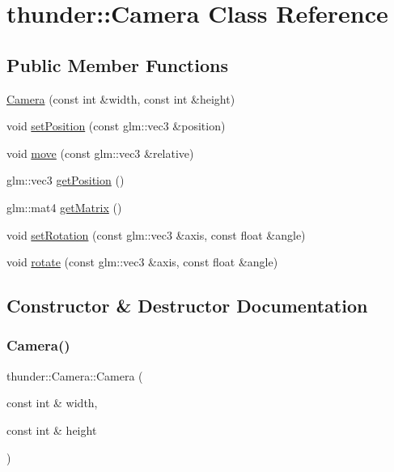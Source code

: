 \hypertarget{classthunder_1_1_camera}{}\section{thunder\+:\+:Camera Class Reference}
\label{classthunder_1_1_camera}
\subsection*{Public Member Functions}
\begin{DoxyCompactItemize}
\item 
\mbox{\hyperlink{classthunder_1_1_camera_a8d5076474df63a88c77cb072859fb955}{Camera}} (const int \&width, const int \&height)
\item 
void \mbox{\hyperlink{classthunder_1_1_camera_a6095f7b60a507434cb74e5fcb542183e}{set\+Position}} (const glm\+::vec3 \&position)
\item 
void \mbox{\hyperlink{classthunder_1_1_camera_a6161ae2a40fe77a56fec1cf058241d29}{move}} (const glm\+::vec3 \&relative)
\item 
glm\+::vec3 \mbox{\hyperlink{classthunder_1_1_camera_a56cd58d018436be6bb1cd47a8d356021}{get\+Position}} ()
\item 
glm\+::mat4 \mbox{\hyperlink{classthunder_1_1_camera_aca107f66761e0d19615b4ade8c706c66}{get\+Matrix}} ()
\item 
void \mbox{\hyperlink{classthunder_1_1_camera_af585912a2b2efcb4d514ce4983d5faea}{set\+Rotation}} (const glm\+::vec3 \&axis, const float \&angle)
\item 
void \mbox{\hyperlink{classthunder_1_1_camera_adaf17dcb64874463c4df918d9fc1a736}{rotate}} (const glm\+::vec3 \&axis, const float \&angle)
\end{DoxyCompactItemize}


\subsection{Constructor \& Destructor Documentation}
\mbox{\label{classthunder_1_1_camera_a8d5076474df63a88c77cb072859fb955}} 
\subsubsection{\texorpdfstring{Camera()}{Camera()}}
{\footnotesize\ttfamily thunder\+::\+Camera\+::\+Camera (\begin{DoxyParamCaption}\item[{const int \&}]{width,  }\item[{const int \&}]{height }\end{DoxyParamCaption})}

